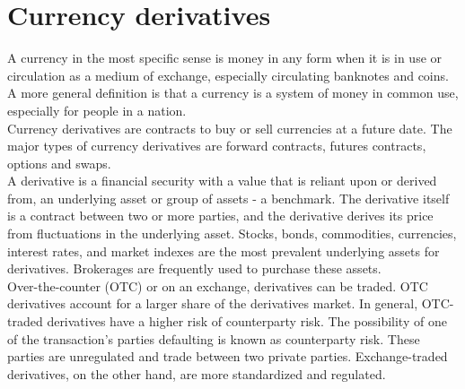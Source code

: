 \documentclass[a4 paper, 12pt]{report}
\theoremstyle{plain}
\begin{document}
\section{Currency derivatives}
\noindent
\par A currency in the most specific sense is money in any form when it is in use or
circulation as a medium of exchange, especially circulating banknotes and coins. A more
general definition is that a currency is a system of money in common use, especially for
people in a nation.\\
Currency derivatives are contracts to buy or sell currencies at a future date. The major
types of currency derivatives are forward contracts, futures contracts, options and swaps.\\
A derivative is a financial security with a value that is reliant upon or derived from, an
underlying asset or group of assets - a benchmark. The derivative itself is a contract
between two or more parties, and the derivative derives its price from fluctuations in the
underlying asset. Stocks, bonds, commodities, currencies, interest rates, and market
indexes are the most prevalent underlying assets for derivatives. Brokerages are
frequently used to purchase these assets.\\
Over-the-counter (OTC) or on an exchange, derivatives can be traded. OTC derivatives
account for a larger share of the derivatives market. In general, OTC-traded derivatives
have a higher risk of counterparty risk. The possibility of one of the transaction's parties
defaulting is known as counterparty risk. These parties are unregulated and trade
between two private parties. Exchange-traded derivatives, on the other hand, are more
standardized and regulated.
\end{document}
